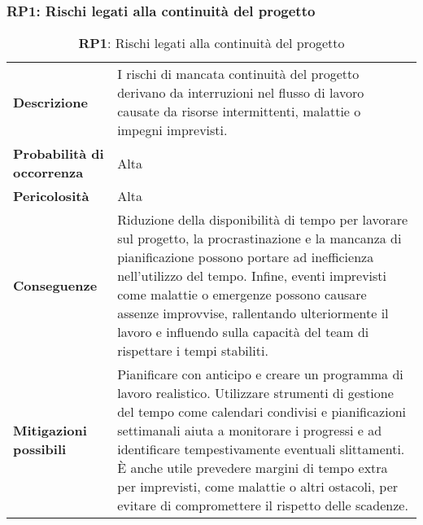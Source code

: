 \subsubsection{RP1: Rischi legati alla continuità del progetto}
\label{sec:Rischi legati alla continuità del progetto}
\begin{table}[h!]
    \centering
    \renewcommand{\arraystretch}{1.5} %
    \begin{tabularx}{\textwidth}{|X|X|}\hline
    \rowcolor[HTML]{FFD700} 
    \multicolumn{2}{|c|}{\textbf{Rischi legati alla mancata continuità del progetto}} \\ \hline
    \textbf{Descrizione} & I rischi di mancata continuità del progetto derivano da interruzioni nel flusso di lavoro causate da risorse intermittenti, malattie o impegni imprevisti.\\ \hline
    \textbf{Probabilità di occorrenza} & Alta \\ \hline
    \textbf{Pericolosità} & Alta \\ \hline
    \textbf{Conseguenze} & Riduzione della disponibilità di tempo per lavorare sul progetto, la procrastinazione e la mancanza di pianificazione possono portare ad inefficienza nell’utilizzo del tempo. Infine, eventi imprevisti come malattie o emergenze possono causare assenze improvvise, rallentando ulteriormente il lavoro e 
    influendo sulla capacità del team di rispettare i tempi stabiliti. \\ \hline
    \textbf{Mitigazioni possibili} & Pianificare con anticipo e creare un programma di lavoro realistico. Utilizzare strumenti di gestione del tempo come calendari condivisi e pianificazioni settimanali 
    aiuta a monitorare i progressi e ad identificare tempestivamente eventuali slittamenti. È anche utile prevedere margini di tempo extra per imprevisti, come malattie o altri ostacoli, per evitare di compromettere il rispetto delle scadenze.\\ \hline
    \end{tabularx}
    \caption{\textbf{RP1}: Rischi legati alla continuità del progetto}
    \end{table}

\newpage

